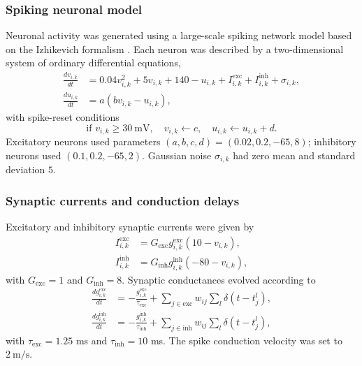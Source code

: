\documentclass[9pt,twoside]{pnas-new}
\begin{document}
\subsubsection*{Spiking neuronal model}

Neuronal activity was generated using a large-scale spiking network model based on the Izhikevich formalism \citep{izhikevich2003simple}. Each neuron was described by a two-dimensional system of ordinary differential equations,
\begin{align}
\frac{dv_{i,k}}{dt} &= 0.04v_{i,k}^2 + 5v_{i,k} + 140 - u_{i,k}
+ I^{\mathrm{exc}}_{i,k} + I^{\mathrm{inh}}_{i,k} + \sigma_{i,k}, \\
\frac{du_{i,k}}{dt} &= a(bv_{i,k} - u_{i,k}),
\end{align}
with spike-reset conditions
\begin{equation}
\text{if } v_{i,k} \geq 30~\mathrm{mV}, \quad v_{i,k} \leftarrow c,\quad u_{i,k} \leftarrow u_{i,k} + d.
\end{equation}
Excitatory neurons used parameters $(a,b,c,d)=(0.02,0.2,-65,8)$; inhibitory neurons used $(0.1,0.2,-65,2)$. Gaussian noise $\sigma_{i,k}$ had zero mean and standard deviation $5$.

\subsubsection*{Synaptic currents and conduction delays}

Excitatory and inhibitory synaptic currents were given by
\begin{align}
I^{\mathrm{exc}}_{i,k} &= G_{\mathrm{exc}} g^{\mathrm{exc}}_{i,k}(10 - v_{i,k}), \\
I^{\mathrm{inh}}_{i,k} &= G_{\mathrm{inh}} g^{\mathrm{inh}}_{i,k}(-80 - v_{i,k}),
\end{align}
with $G_{\mathrm{exc}}=1$ and $G_{\mathrm{inh}}=8$. Synaptic conductances evolved according to
\begin{align}
\frac{dg^{\mathrm{exc}}_{i,k}}{dt} &= -\frac{g^{\mathrm{exc}}_{i,k}}{\tau_{\mathrm{exc}}}
+ \sum_{j \in \mathrm{exc}} w_{ij} \sum_l \delta(t - t_{j}^{l}), \\
\frac{dg^{\mathrm{inh}}_{i,k}}{dt} &= -\frac{g^{\mathrm{inh}}_{i,k}}{\tau_{\mathrm{inh}}}
+ \sum_{j \in \mathrm{inh}} w_{ij} \sum_l \delta(t - t_{j}^{l}),
\end{align}
with $\tau_{\mathrm{exc}}=1.25$ ms and $\tau_{\mathrm{inh}}=10$ ms. The spike conduction velocity was set to $2~\mathrm{m/s}$.
\end{document}
